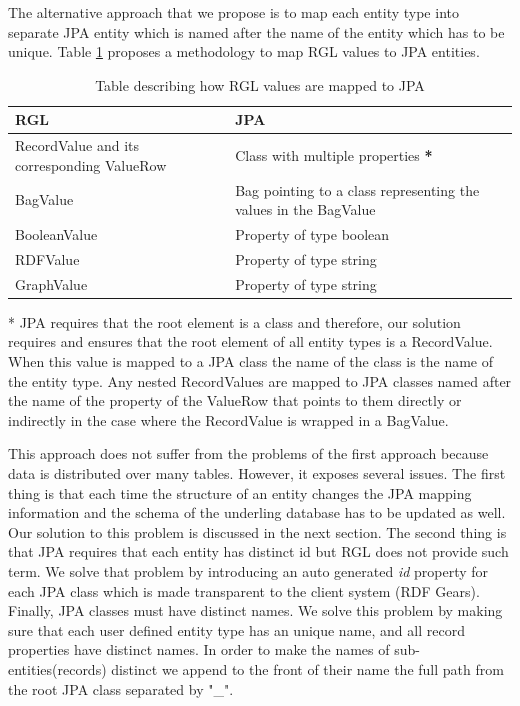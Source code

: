 The alternative approach that we propose is to map each entity type into separate JPA entity which is named after the name of the entity which has to be unique. Table \ref{tbl:rgl2gpa} proposes a methodology to map RGL values to JPA entities.

\begin{table}[h]
    \begin{tabular}{ | l | l |}
    \hline
    RGL & JPA  \\ \hline
    RecordValue and its corresponding ValueRow & Class with multiple properties \textbf{*}  \\ \hline
    BagValue & Bag pointing to a class representing the values in the BagValue \\ \hline
    BooleanValue & Property of type boolean  \\ \hline
    RDFValue & Property of type string  \\ \hline
	GraphValue & Property of type string  \\ \hline
	
    \end{tabular}
     \caption{Table describing how RGL values are mapped to JPA}
    \label{tbl:rgl2gpa}
\end{table}

* JPA requires that the root element is a class and therefore, our solution requires and ensures that the root element of all entity types is a RecordValue. When this value is mapped to a JPA class the name of the class is the name of the entity type. Any nested RecordValues are mapped to JPA classes named after the name of the property of the ValueRow that points to them directly or indirectly in the case where the RecordValue is wrapped in a BagValue.

This approach does not suffer from the problems of the first approach because data is distributed over many tables. However, it exposes several issues. The first thing is that each time the structure of an entity changes the JPA mapping information and the schema of the underling database has to be updated as well. Our solution to this problem is discussed in the next section. The second thing is that JPA requires that each entity has distinct id but RGL does not provide such term. We solve that problem by introducing an auto generated \textit{id} property for each JPA class which is made transparent to the client system (RDF Gears). Finally, JPA classes must have distinct names. We solve this problem by making sure that each user defined entity type has an unique name, and all record properties have distinct names. In order to make the names of sub-entities(records) distinct we append to the front of their name the full path from the root JPA class separated by "\_".


